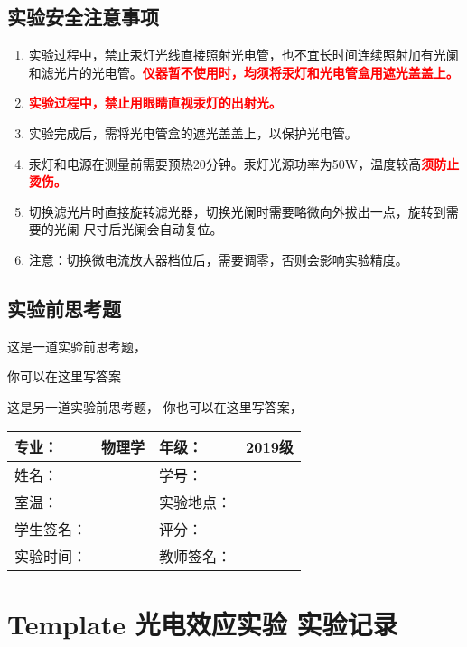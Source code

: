 \documentclass[dvipsnames, svgnames,a4paper,11pt]{article}
\begin{document}
\subsection{实验安全注意事项}
\begin{enumerate}
	\item 实验过程中，禁止汞灯光线直接照射光电管，也不宜长时间连续照射加有光阑和滤光片的光电管。\textcolor{red}{\textbf{仪器暂不使用时，均须将汞灯和光电管盒用遮光盖盖上。}}
	\item \textcolor{red}{\textbf{ 实验过程中，禁止用眼睛直视汞灯的出射光。}}
	\item 实验完成后，需将光电管盒的遮光盖盖上，以保护光电管。
	\item 汞灯和电源在测量前需要预热20分钟。汞灯光源功率为50W，温度较高\textcolor{red}{\textbf{须防止烫伤。}}
	\item 切换滤光片时直接旋转滤光器，切换光阑时需要略微向外拔出一点，旋转到需要的光阑
	尺寸后光阑会自动复位。
	\item 注意：切换微电流放大器档位后，需要调零，否则会影响实验精度。	
\end{enumerate}

\subsection{实验前思考题}
\begin{question}
	这是一道实验前思考题，\lipsum[10]
\end{question}
你可以在这里写答案

\begin{question}
	这是另一道实验前思考题，\lipsum[11]
	\tcblower
	你也可以在这里写答案，\lipsum[12]
\end{question}

\clearpage
\begin{table}
	\renewcommand\arraystretch{1.7}
	\centering
	\begin{tabularx}{\textwidth}{|X|X|X|X|}
	\hline
	专业：& 物理学 &年级：& 2019级 \\
	\hline
	姓名： & & 学号：&\\
	\hline
	室温：& & 实验地点： & \\
	\hline
	学生签名：& & 评分： &\\
	\hline
	实验时间：& & 教师签名：&\\
	\hline
	\end{tabularx}
\end{table}

\section{Template 光电效应实验 \quad\heiti 实验记录}
\end{document}
